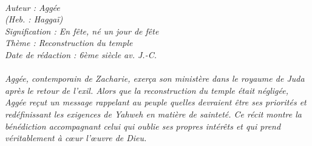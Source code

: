 \BFont
\noindent\hrulefill
{\footnotesize
\textit{
\bigskip
{\centering{}
\\Auteur : Aggée
\\(Heb. : Haggaï)
\\Signification : En fête, né un jour de fête
\\Thème : Reconstruction du temple
\\Date de rédaction : 6ème siècle av. J.-C.\\}
}
\textit{
\\Aggée, contemporain de Zacharie, exerça son ministère dans le royaume de Juda après le retour de l’exil. Alors que la reconstruction du temple était négligée, Aggée reçut un message rappelant au peuple quelles devraient être ses priorités et redéfinissant les exigences de Yahweh en matière de sainteté. Ce récit montre la bénédiction accompagnant celui qui oublie ses propres intérêts et qui prend véritablement à cœur l’œuvre de Dieu.\bigskip
}
}
\par\nobreak\noindent\hrulefill
